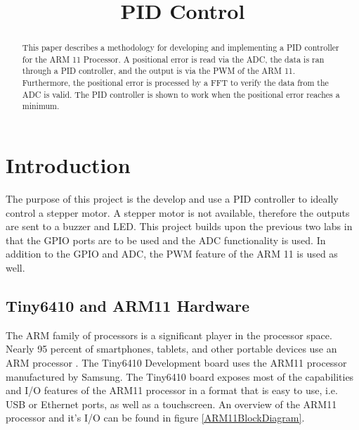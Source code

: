 \documentclass[10pt,conference]{IEEEtran}
\begin{document}
\title{PID Control}

\author
{
}

\maketitle

%
%
\begin{abstract}
This paper describes a methodology for developing and implementing a PID controller for the ARM 11 Processor. A positional error is read via the ADC, the data is ran through a PID controller, and the output is via the PWM of the ARM 11. Furthermore, the positional error is processed by a FFT to verify the data from the ADC is valid. The PID controller is shown to work when the positional error reaches a minimum.
\end{abstract}


%
%
\section{Introduction}
The purpose of this project is the develop and use a PID controller to ideally control a stepper motor. A stepper motor is not available, therefore the outputs are sent to a buzzer and LED. This project builds upon the previous two labs in that the GPIO ports are to be used and the ADC functionality is used.  In addition to the GPIO and ADC, the PWM feature of the ARM 11 is used as well.

\subsection{Tiny6410 and ARM11 Hardware}
The ARM family of processors is a significant player in the processor space. Nearly 95 percent of smartphones, tablets, and other portable devices use an ARM processor \cite{ARMSales}. The Tiny6410 Development board uses the ARM11 processor manufactured by Samsung. The Tiny6410 board exposes most of the capabilities and I/O features of the ARM11 processor in a format that is easy to use, i.e. USB or Ethernet ports, as well as a touchscreen. An overview of the ARM11 processor and it's I/O can be found in figure \ref{ARM11BlockDiagram}.
\end{document}
